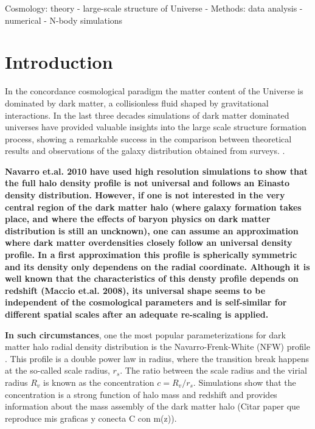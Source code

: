 \documentclass[a4,useAMS,usenatbib,usegraphicx]{mn2e}
\begin{document}
\begin{keywords}
Cosmology: theory - large-scale structure of Universe -
Methods: data analysis - numerical - N-body simulations
\end{keywords}


\section{Introduction}
\label{sec:introduction}
In the concordance cosmological paradigm the matter content of the
Universe is dominated by dark matter, a collisionless fluid shaped by
gravitational interactions.  In the last three decades simulations of
dark matter dominated universes have provided valuable insights into
the large scale structure formation process, showing a remarkable
success in the comparison between theoretical results and observations
of the galaxy distribution obtained from surveys.
\citep{Springel2005,2011ApJ...740..102K}.

{\bf Navarro et.al. 2010 have used high resolution simulations to show
  that the full halo density profile is not universal and follows an
  Einasto density distribution. However, if one is not interested in
  the very central region of the dark matter halo (where galaxy
  formation takes place, and where the effects of baryon physics on
  dark matter distribution is still an uncknown), one can assume an
  approximation where dark matter overdensities closely follow an
  universal density profile. In a first approximation this profile is
  spherically symmetric and its density only dependens on the radial
  coordinate. Although it is well known that the characteristics of
  this densty profile depends on redshift (Maccio et.al. 2008), its
  universal shape seems to be independent of the cosmological
  parameters and is self-similar for different spatial scales after an
  adequate re-scaling is applied. \citep{NFW,Taylor2001}
}

{\bf In such circumstances}, one the most popular parameterizations
for dark matter halo radial density distribution is the
Navarro-Frenk-White (NFW) profile \citep{NFW}.  This profile is a
double power law in radius, where the transition break happens at the
so-called scale radius, $r_s$.  The ratio between the scale radius and
the virial radius $R_v$ is known as the concentration $c=R_v/r_s$.
Simulations show that the concentration is a strong function of halo
mass and redshift and provides information about the mass assembly of
the dark matter halo (Citar paper que reproduce mis graficas y conecta
C con m(z)).
\end{document}
